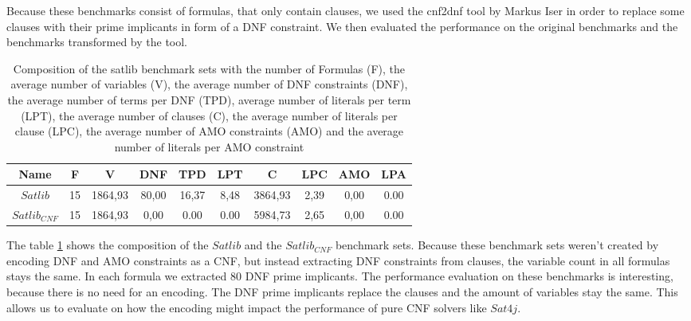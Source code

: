 Because these benchmarks consist of formulas, that only contain clauses, we used the cnf2dnf tool \cite{iser_pi-explanations_2022} by Markus Iser in order to replace some clauses with their prime implicants in form of a DNF constraint. We then evaluated the performance on the original benchmarks and the benchmarks transformed by the tool.

\begin{table}[!htb]
\centering
\caption[Composition of the satlib benchmark sets]{Composition of the satlib benchmark sets with the number of Formulas (F), the average number of variables (V), the average number of DNF constraints (DNF), the average number of terms per DNF (TPD), average number of literals per term (LPT), the average number of clauses (C), the average number of literals per clause (LPC), the average number of AMO constraints (AMO) and the average number of literals per AMO constraint}
\label{tab:satlib}
\begin{tabular}{|c|c|c|c|c|c|c|c|c|c|}
\hline
Name & F & V & DNF & TPD & LPT & C & LPC & AMO & LPA \\
\hline
$Satlib$ & 15 & 1864,93 & 80,00 & 16,37 & 8,48 & 3864,93 & 2,39 & 0,00 & 0.00 \\ 
 \hline 
$Satlib_{CNF}$ & 15 & 1864,93 & 0,00 & 0.00 & 0.00 & 5984,73 & 2,65 & 0,00 & 0.00 \\ 
 \hline 
\end{tabular}
\end{table}

The table \ref{tab:satlib} shows the composition of the $Satlib$ and the $Satlib_{CNF}$ benchmark sets. Because these benchmark sets weren't created by encoding DNF and AMO constraints as a CNF, but instead extracting DNF constraints from clauses, the variable count in all formulas stays the same. In each formula we extracted 80 DNF prime implicants. The performance evaluation on these benchmarks is interesting, because there is no need for an encoding. The DNF prime implicants replace the clauses and the amount of variables stay the same. This allows us to evaluate on how the encoding might impact the performance of pure CNF solvers like $Sat4j$.




